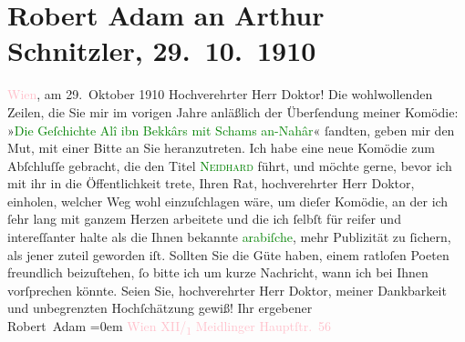 

               \section[Robert Adam an Arthur Schnitzler, 29. 10. 1910]{ Robert Adam an Arthur Schnitzler, 29. 10. 1910}\nopagebreak{}\rehead{ }\normalsize\beginnumbering{} \toendnotes[C]{\smallbreak\pagebreak[2]} 
\toendnotes[C]{\smallbreak}\pstart
           \raggedleft{}{\pb}\textcolor{pink}{Wien}{}\ledrightnote{\textcolor{pink}{Wien}}, am 29. Oktober 1910\pend
           \pstart{}Hochverehrter Herr Doktor!\pend\pstart
           Die wohlwollenden Zeilen, die Sie mir im vorigen Jahre anläßlich der Überſendung
                    meiner Komödie: »\textcolor{green}{Die Geſchichte Alî ibn Bekkârs mit
                        Schams an-Nahâr}{}\ledrightnote{\textcolor{green}{Die Geschichte des Alî ibn Bekkâr mit Schams an-Nahâr}}« ſandten, geben mir den Mut, mit einer Bitte an Sie
                    heranzutreten.\pend
           \pstart
           Ich habe eine neue Komödie zum Abſchluſſe gebracht, die den Titel \textcolor{green}{\textsc{Neidhard}}{}\ledrightnote{\textcolor{green}{Neidhard}} führt, und möchte gerne, bevor ich mit ihr in die Öffentlichkeit trete,
                    {\pb}Ihren Rat, hochverehrter Herr Doktor, einholen,
                    welcher Weg wohl einzuſchlagen wäre, um dieſer Komödie, an der ich ſehr lang mit
                    ganzem Herzen arbeitete und die ich ſelbſt für reifer und intereſſanter halte
                    als die Ihnen bekannte \textcolor{green}{arabiſche}{}, mehr Publizität zu ſichern, als jener zuteil geworden
                    iſt.\pend
           \pstart
           Sollten Sie die Güte haben, einem ratloſen Poeten freundlich beizuſtehen, ſo
                    bitte ich um kurze Nachricht, wann ich bei Ihnen vorſprechen könnte.\pend
           \pstart
           Seien Sie, hochverehrter Herr Doktor, meiner Dankbarkeit und unbegrenzten
                    Hochſchätzung gewiß!\pend
           \pstart
           Ihr ergebener{\\[\baselineskip]}\spacefill\mbox{Robert Adam}\pend
           \leftskip=0em{}\pstart
           \noindent{}\textcolor{pink}{Wien XII/\textsubscript{1} Meidlinger
                            Hauptſtr. 56}{}\ledrightnote{\textcolor{pink}{Meidlinger Hauptstraße}}\pend
           \endnumbering{}  
      